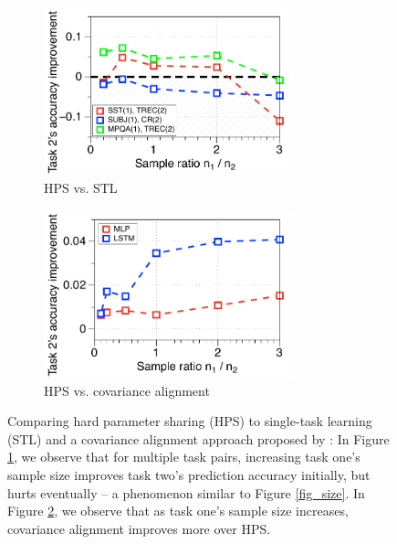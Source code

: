 \begin{figure}%
	\begin{subfigure}[t]{0.5\textwidth}
		\centering
		\vspace{0pt}
		\includegraphics[width=0.8\textwidth]{figures/fig3a.pdf}
		\caption{HPS vs. STL}
		\label{fig_ab_data}
	\end{subfigure}\hfill
	\begin{subfigure}[t]{0.5\textwidth}
		\centering
		\vspace{0pt}
		\includegraphics[width=0.8\textwidth]{figures/fig3b.pdf}
		\caption{HPS vs. covariance alignment}
		\label{fig_ab_cov}
	\end{subfigure}
	\caption{Comparing hard parameter sharing (HPS) to single-task learning (STL) and a covariance alignment approach proposed by \citet{WZR20}:
	In Figure \ref{fig_ab_data}, we observe that for multiple task pairs, increasing task one's sample size improves task two's prediction accuracy initially, but hurts eventually -- a phenomenon similar  to Figure \ref{fig_size}.
	In Figure \ref{fig_ab_cov}, we observe that as task one's sample size increases, covariance alignment improves more over HPS.}
	\label{fig_text}

\end{figure}
